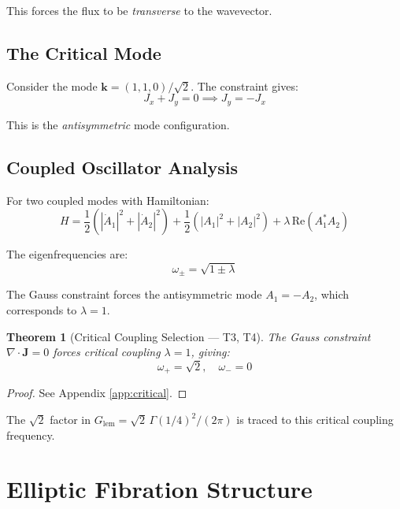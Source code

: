 \documentclass[11pt,a4paper]{article}
\newtheorem{theorem}{Theorem}[section]
\theoremstyle{definition}
\theoremstyle{remark}
\newcommand{\Glem}{G_{\text{lem}}}
\begin{document}
This forces the flux to be \emph{transverse} to the wavevector.

\subsection{The Critical Mode}

Consider the mode $\mathbf{k} = (1, 1, 0)/\sqrt{2}$. The constraint gives:
\begin{equation}
    J_x + J_y = 0 \implies J_y = -J_x
\end{equation}

This is the \emph{antisymmetric} mode configuration.

\subsection{Coupled Oscillator Analysis}

For two coupled modes with Hamiltonian:
\begin{equation}
    H = \frac{1}{2}(|\dot{A}_1|^2 + |\dot{A}_2|^2) + \frac{1}{2}(|A_1|^2 + |A_2|^2) + \lambda\, \text{Re}(A_1^* A_2)
\end{equation}

The eigenfrequencies are:
\begin{equation}
    \omega_\pm = \sqrt{1 \pm \lambda}
\end{equation}

The Gauss constraint forces the antisymmetric mode $A_1 = -A_2$, which corresponds to $\lambda = 1$.

\begin{theorem}[Critical Coupling Selection --- T3, T4]
The Gauss constraint $\nabla \cdot \mathbf{J} = 0$ forces critical coupling $\lambda = 1$, giving:
\begin{equation}
    \omega_+ = \sqrt{2}, \quad \omega_- = 0
\end{equation}
\end{theorem}

\begin{proof}
See Appendix \ref{app:critical}.
\end{proof}

The $\sqrt{2}$ factor in $\Glem = \sqrt{2}\,\Gamma(1/4)^2/(2\pi)$ is traced to this critical coupling frequency.

\section{Elliptic Fibration Structure}
\end{document}
